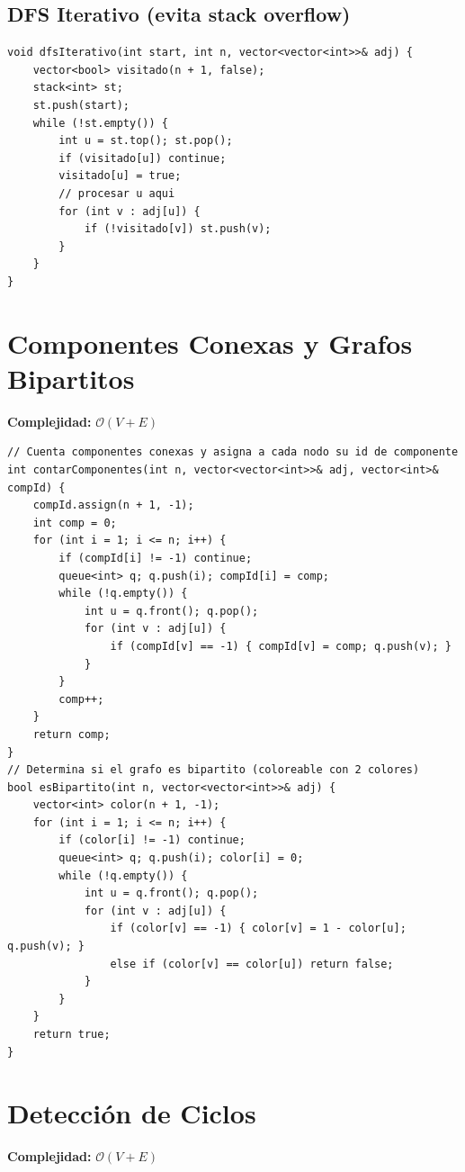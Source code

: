 \documentclass[10pt,twocolumn,letterpaper]{report}
\begin{document}
\subsection{DFS Iterativo (evita stack overflow)}
\begin{lstlisting}
void dfsIterativo(int start, int n, vector<vector<int>>& adj) {
    vector<bool> visitado(n + 1, false);
    stack<int> st;
    st.push(start);
    while (!st.empty()) {
        int u = st.top(); st.pop();
        if (visitado[u]) continue;
        visitado[u] = true;
        // procesar u aqui
        for (int v : adj[u]) {
            if (!visitado[v]) st.push(v);
        }
    }
}
\end{lstlisting}

\section{Componentes Conexas y Grafos Bipartitos}
\textbf{Complejidad:} $\mathcal{O}(V + E)$
\begin{lstlisting}
// Cuenta componentes conexas y asigna a cada nodo su id de componente
int contarComponentes(int n, vector<vector<int>>& adj, vector<int>& compId) {
    compId.assign(n + 1, -1);
    int comp = 0;
    for (int i = 1; i <= n; i++) {
        if (compId[i] != -1) continue;
        queue<int> q; q.push(i); compId[i] = comp;
        while (!q.empty()) {
            int u = q.front(); q.pop();
            for (int v : adj[u]) {
                if (compId[v] == -1) { compId[v] = comp; q.push(v); }
            }
        }
        comp++;
    }
    return comp;
}
// Determina si el grafo es bipartito (coloreable con 2 colores)
bool esBipartito(int n, vector<vector<int>>& adj) {
    vector<int> color(n + 1, -1);
    for (int i = 1; i <= n; i++) {
        if (color[i] != -1) continue;
        queue<int> q; q.push(i); color[i] = 0;
        while (!q.empty()) {
            int u = q.front(); q.pop();
            for (int v : adj[u]) {
                if (color[v] == -1) { color[v] = 1 - color[u]; q.push(v); }
                else if (color[v] == color[u]) return false;
            }
        }
    }
    return true;
}
\end{lstlisting}

\section{Detección de Ciclos}
\textbf{Complejidad:} $\mathcal{O}(V + E)$
\end{document}
